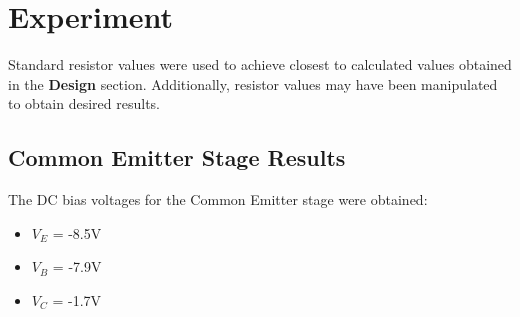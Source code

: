 \documentclass[12pt]{article}
\begin{document}
\begin{figure}[H]
    \centering
\end{figure}

\section{Experiment}
Standard resistor values were used to achieve closest to calculated values obtained in the \textbf{Design} section. Additionally, resistor values may have been manipulated to obtain desired results.

\subsection{Common Emitter Stage Results}
The DC bias voltages for the Common Emitter stage were obtained:
\begin{itemize}
    \item $V_E$ = -8.5V
    \item $V_B$ = -7.9V
    \item $V_C$ = -1.7V
\end{itemize}
\end{document}
